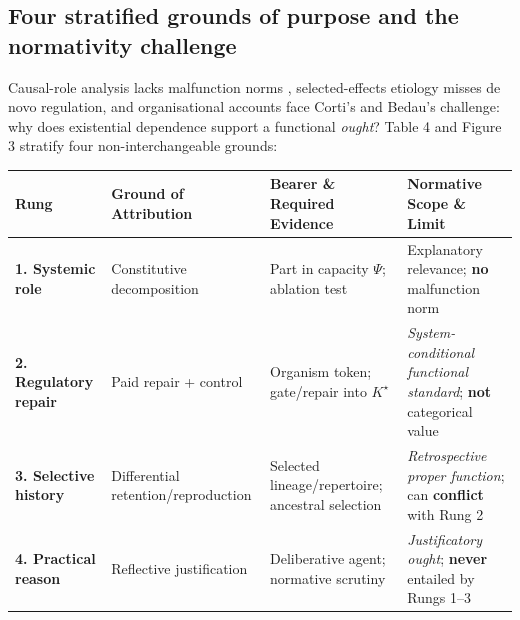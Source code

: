 \documentclass[12pt,letterpaper]{article}
\newcounter{none}
\begin{document}
\subsection{Four stratified grounds of purpose and the normativity
challenge}\label{four-stratified-grounds-of-purpose-and-the-normativity-challenge}

Causal-role analysis \citep{cummins1975} lacks malfunction norms
\citep{davies2001}, selected-effects etiology
\citep{wright1973, millikan1984, neander1991, godfreySmith1994} misses
de novo regulation, and organisational accounts
\citep{mossio2009, bich2024} face Corti's \citeyearpar[\S{}3]{corti2023}
and Bedau's \citeyearpar{bedau1992} challenge: why does existential
dependence support a functional \emph{ought}? Table 4 and Figure 3
stratify four non-interchangeable grounds:


{\def\LTcaptype{none} %
\begin{longtable}[]{@{}
  >{\raggedright\arraybackslash}p{}
  >{\raggedright\arraybackslash}p{}
  >{\raggedright\arraybackslash}p{}
  >{\raggedright\arraybackslash}p{}@{}}
\toprule\noalign{}
\begin{minipage}[b]{\linewidth}\raggedright
Rung
\end{minipage} & \begin{minipage}[b]{\linewidth}\raggedright
Ground of Attribution
\end{minipage} & \begin{minipage}[b]{\linewidth}\raggedright
Bearer \& Required Evidence
\end{minipage} & \begin{minipage}[b]{\linewidth}\raggedright
Normative Scope \& Limit
\end{minipage} \\
\midrule\noalign{}
\endhead
\bottomrule\noalign{}
\endlastfoot
\textbf{1. Systemic role} & Constitutive decomposition
\citep{cummins1975, craver2007} & Part in capacity \(\Psi\); ablation
test & Explanatory relevance; \textbf{no} malfunction norm
\citep{davies2001} \\
\textbf{2. Regulatory repair} & Paid repair + control
\citep{nagel1977, mossio2009, diPaolo2005, bich2024} & Organism token;
gate/repair into \(K^\star\) & \emph{System-conditional functional
standard}; \textbf{not} categorical value \\
\textbf{3. Selective history} & Differential retention/reproduction
\citep{wright1973, millikan1984, garson2019} & Selected
lineage/repertoire; ancestral selection & \emph{Retrospective proper
function}; can \textbf{conflict} with Rung 2 \\
\textbf{4. Practical reason} & Reflective justification
\citep{korsgaard1996, scanlon1998, list2019} & Deliberative agent;
normative scrutiny & \emph{Justificatory ought}; \textbf{never} entailed
by Rungs 1--3 \citep{street2006} \\
\end{longtable}
}
\end{document}
